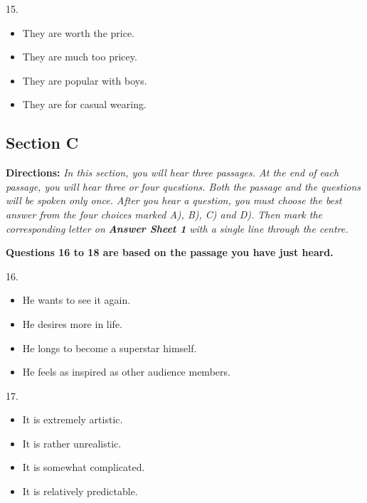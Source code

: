 \documentclass[UTF8,11pt]{ctexart}
\begin{document}
15.


\begin{itemize}[leftmargin=2em,itemsep=.2em,topsep=.4em]\item[A.] They are worth the price.
\item[B.] They are much too pricey.
\item[C.] They are popular with boys.
\item[D.] They are for casual wearing.
\end{itemize}

\subsection*{\textbf{Section C}}


\textbf{Directions:}\textit{ In this section, you will hear three passages. At the end of each passage, you will hear three or} \textit{four questions. Both the passage and the questions will be spoken only once. After you hear a question, you} \textit{must choose the best answer from the four choices marked A), B), C) and D). Then mark the corresponding} \textit{letter on }\textbf{\textit{Answer Sheet 1}}\textit{ with a single line through the centre.}


\textbf{Questions 16 to 18 are based on the passage you have just heard.}


16.


\begin{itemize}[leftmargin=2em,itemsep=.2em,topsep=.4em]\item[A.] He wants to see it again.
\item[B.] He desires more in life.
\end{itemize}

\begin{itemize}[leftmargin=2em,itemsep=.2em,topsep=.4em]\item[C.] He longs to become a superstar himself.
\item[D.] He feels as inspired as other audience members.
\end{itemize}

17.


\begin{itemize}[leftmargin=2em,itemsep=.2em,topsep=.4em]\item[A.] It is extremely artistic.
\item[B.] It is rather unrealistic.
\item[C.] It is somewhat complicated.
\item[D.] It is relatively predictable.
\end{itemize}
\end{document}
